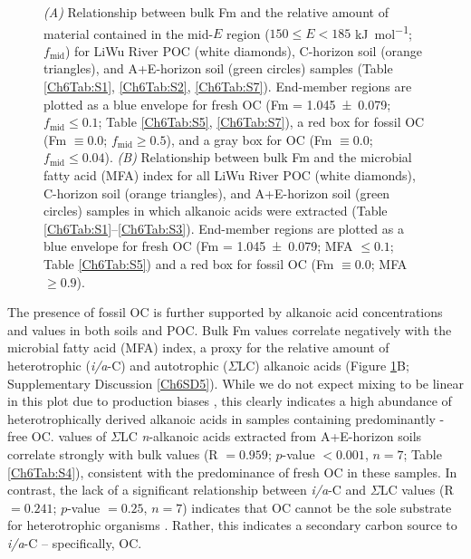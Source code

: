 \begin{figure}[p]
	\caption[$f_{\text{mid}}$ and MFA index vs. Fm mixing plots]{\textit{(A)} Relationship between bulk Fm and the relative amount of material contained in the mid-$E$ region ($150 \leq E < 185$ \si{kJ.mol^{-1}}; $f_{\text{mid}}$) for LiWu River POC (white diamonds), C-horizon soil (orange triangles), and A+E-horizon soil (green circles) samples (Table \ref{Ch6Tab:S1}, \ref{Ch6Tab:S2}, \ref{Ch6Tab:S7}). End-member regions are plotted as a blue envelope for fresh OC (Fm = \num{1.045 \pm 0.079}; $f_{\text{mid}} \leq 0.1$; Table \ref{Ch6Tab:S5}, \ref{Ch6Tab:S7}), a red box for fossil OC (Fm $\equiv 0.0$; $f_{\text{mid}} \geq 0.5$), and a gray box for OC (Fm $\equiv 0.0$; $f_{\text{mid}} \leq 0.04$). \textit{(B)} Relationship between bulk Fm and the microbial fatty acid (MFA) index for all LiWu River POC (white diamonds), C-horizon soil (orange triangles), and A+E-horizon soil (green circles) samples in which alkanoic acids were extracted (Table \ref{Ch6Tab:S1}--\ref{Ch6Tab:S3}). End-member regions are plotted as a blue envelope for fresh OC (Fm = \num{1.045 \pm 0.079}; MFA $\leq 0.1$; Table \ref{Ch6Tab:S5}) and a red box for fossil OC (Fm $\equiv 0.0$; MFA $\geq 0.9$).}
	\label{Ch6Fig:3} 
\end{figure}

The presence of fossil OC is further supported by alkanoic acid concentrations and  values in both soils and POC. Bulk Fm values correlate negatively with the microbial fatty acid (MFA) index, a proxy for the relative amount of heterotrophic (\textit{i/a}-C) and autotrophic ($\Sigma$LC) alkanoic acids (Figure \ref{Ch6Fig:3}B; Supplementary Discussion \ref{Ch6SD5}). While we do not expect mixing to be linear in this plot due to production biases \citep{Hemingway:2016bq}, this clearly indicates a high abundance of heterotrophically derived alkanoic acids in samples containing predominantly -free OC.  values of $\Sigma$LC \textit{n}-alkanoic acids extracted from A+E-horizon soils correlate strongly with bulk  values (R $= 0.959$; $p$-value $< 0.001$, $n = 7$; Table \ref{Ch6Tab:S4}), consistent with the predominance of fresh OC in these samples. In contrast, the lack of a significant relationship between \textit{i/a}-C and $\Sigma$LC  values (R $= 0.241$; $p$-value $= 0.25$, $n = 7$) indicates that OC cannot be the sole substrate for heterotrophic organisms \citep{Blair:1985ti}. Rather, this indicates a secondary carbon source to \textit{i/a}-C -- specifically, OC.

